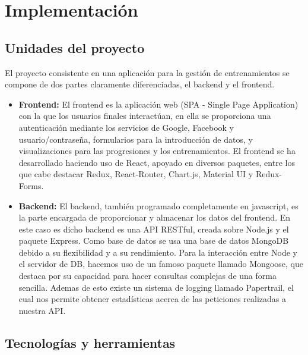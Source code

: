 \chapter{Implementación}

\section {Unidades del proyecto}
El proyecto consistente en una aplicación para la gestión de entrenamientos se compone de dos partes claramente diferenciadas, el backend y el frontend.
\begin{itemize}
  \item \textbf{Frontend:} El frontend es la aplicación web (\gls{SPA} - Single Page Application) con la que los usuarios finales interactúan, en ella se proporciona una autenticación mediante los servicios de Google, Facebook y usuario/contraseña, formularios para la introducción de datos, y visualizaciones para las progresiones y los entrenamientos. El frontend se ha desarrollado haciendo uso de React, apoyado en diversos paquetes, entre los que cabe destacar Redux, React-Router, Chart.js, Material UI y Redux-Forms.
  \item \textbf{Backend:} El backend, también programado completamente en javascript, es la parte encargada de proporcionar y almacenar los datos del frontend. En este caso es dicho backend es una API RESTful, creada sobre Node.js y el paquete Express. Como base de datos se usa una base de datos MongoDB debido a su flexibilidad y a su rendimiento. Para la interacción entre Node y el servidor de DB, hacemos uso de un famoso paquete llamado Mongoose, que destaca por su capacidad para hacer consultas complejas de una forma sencilla. Ademas de esto existe un sistema de \gls{logging} llamado Papertrail, el cual nos permite obtener estadísticas acerca de las peticiones realizadas a nuestra API.
\end{itemize}

\section {Tecnologías y herramientas}
